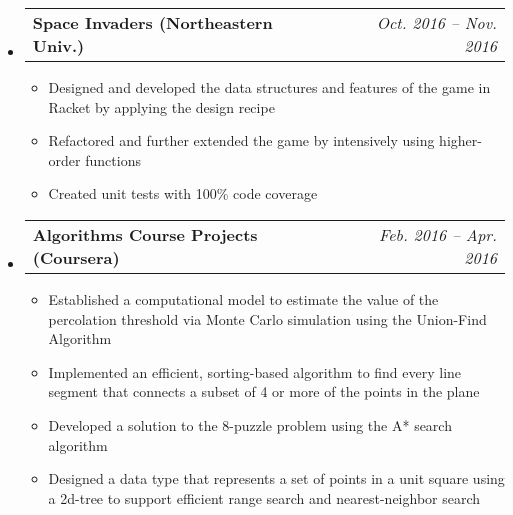 \documentclass[letterpaper,11pt]{article}
\makeatletter
\newcommand{\resitem}[1]{\item #1 \vspace{-2pt}}
\newcommand{\ressubheadingproj}[4]{
\begin{tabular*}{6.5in}{l@{\extracolsep{\fill}}r}
    \textbf{#1} & \textit{#2} \\
\end{tabular*}\vspace{-6pt}}
\makeatother
\begin{document}
    \begin{itemize}
        \item
        \ressubheadingproj{Space Invaders {\normalfont (Northeastern Univ.)}}{Oct. 2016 -- Nov. 2016}
        {Web Development Intern}{Nov. 2014 -- Mar. 2015}
        { \footnotesize
        \begin{itemize}
            \resitem{Designed and developed the data structures and features of the game in Racket by applying the design recipe}
            \resitem{Refactored and further extended the game by intensively using higher-order functions}
            \resitem{Created unit tests with 100\% code coverage}

        \end{itemize}
        }
    \end{itemize}
    \begin{itemize}
        \item
        \ressubheadingproj{Algorithms Course Projects {\normalfont (Coursera)}}{Feb. 2016 -- Apr. 2016}
        {Web Development Intern}{Nov. 2014 -- Mar. 2015}
        { \footnotesize
        \begin{itemize}
            \resitem{Established a computational model to estimate the value of the percolation threshold via Monte Carlo simulation using the Union-Find Algorithm}
            \resitem{Implemented an efficient, sorting-based algorithm to find every line segment that connects a subset of 4 or more of the points in the plane}
            \resitem{Developed a solution to the 8-puzzle problem using the A* search algorithm}
            \resitem{Designed a data type that represents a set of points in a unit square using a 2d-tree to support efficient range
            search and nearest-neighbor search}
        \end{itemize}
        }
    \end{itemize}
\end{document}
